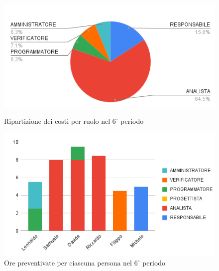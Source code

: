 \begin{figure}[H]
  \centering
  \includegraphics[width=0.6\linewidth]{grafici/6_periodo_torta.png}
  \caption{Ripartizione dei costi per ruolo nel $6^\circ$ periodo}
        \vspace{10mm}
  \includegraphics[width=0.7\linewidth]{grafici/6_periodo_istogramma.png}
  \caption{Ore preventivate per ciascuna persona nel $6^\circ$ periodo}
\end{figure}

